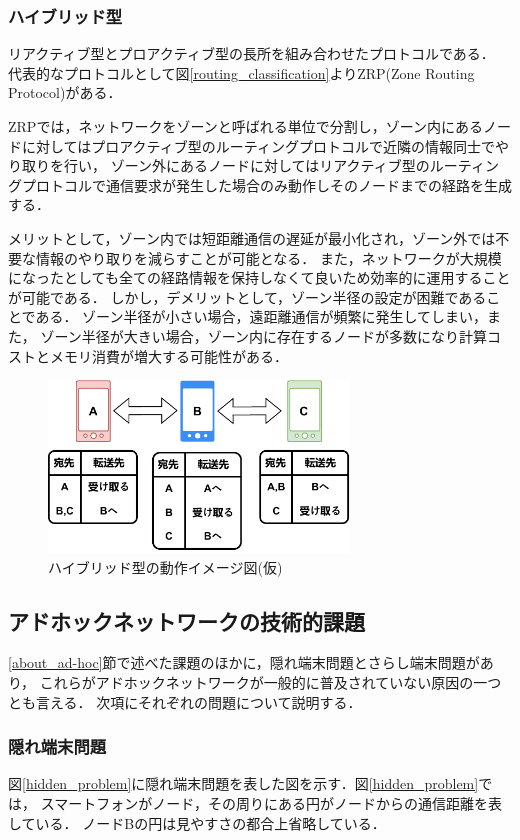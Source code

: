 \documentclass[a4paper, 11pt]{ltjsarticle}
\begin{document}
\subsubsection{ハイブリッド型}
リアクティブ型とプロアクティブ型の長所を組み合わせたプロトコルである．
代表的なプロトコルとして図\ref{routing_classification}よりZRP(Zone Routing Protocol)\cite{1574231874891177344}がある．

ZRPでは，ネットワークをゾーンと呼ばれる単位で分割し，ゾーン内にあるノードに対してはプロアクティブ型のルーティングプロトコルで近隣の情報同士でやり取りを行い，
ゾーン外にあるノードに対してはリアクティブ型のルーティングプロトコルで通信要求が発生した場合のみ動作しそのノードまでの経路を生成する．

メリットとして，ゾーン内では短距離通信の遅延が最小化され，ゾーン外では不要な情報のやり取りを減らすことが可能となる．
また，ネットワークが大規模になったとしても全ての経路情報を保持しなくて良いため効率的に運用することが可能である．
しかし，デメリットとして，ゾーン半径の設定が困難であることである．
ゾーン半径が小さい場合，遠距離通信が頻繁に発生してしまい，また，
ゾーン半径が大きい場合，ゾーン内に存在するノードが多数になり計算コストとメモリ消費が増大する可能性がある．

\begin{figure}[H]
  \centering
  \includegraphics[width=80mm]{proactive_model.pdf}
  \caption{ハイブリッド型の動作イメージ図(仮)}
  \label{hybrid}
\end{figure}

\clearpage
\subsection{アドホックネットワークの技術的課題}
\ref{about_ad-hoc}節で述べた課題のほかに，隠れ端末問題とさらし端末問題があり，
これらがアドホックネットワークが一般的に普及されていない原因の一つとも言える\cite{松井_進2012KJ00008330022}．
次項にそれぞれの問題について説明する．
\subsubsection{隠れ端末問題}
図\ref{hidden_problem}に隠れ端末問題を表した図を示す．図\ref{hidden_problem}では，
スマートフォンがノード，その周りにある円がノードからの通信距離を表している．
ノードBの円は見やすさの都合上省略している．
\end{document}
